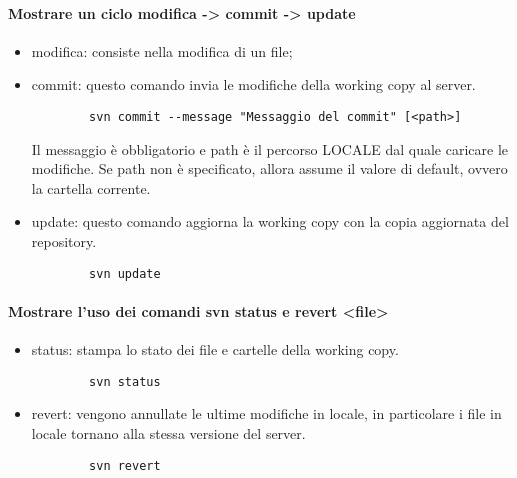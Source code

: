 \documentclass[a4paper]{article}
\begin{document}
	\paragraph{Mostrare un ciclo modifica -> commit -> update}
	\begin{itemize}
		\item modifica: consiste nella modifica di un file;
		\item commit: questo comando invia le modifiche della working copy al server.\begin{verbatim}
		svn commit --message "Messaggio del commit" [<path>]
		\end{verbatim}
		Il messaggio è obbligatorio e path è il percorso LOCALE dal quale caricare le modifiche. Se path non è specificato, allora assume il valore di default, ovvero la cartella corrente.
		\item update: questo comando aggiorna la working copy con la copia aggiornata del repository.
		\begin{verbatim}
		svn update
		\end{verbatim}
	\end{itemize}
	
	\paragraph{Mostrare l'uso dei comandi svn status e revert <file>}
	\begin{itemize}
		\item status: stampa lo stato dei file e cartelle della working copy.
		\begin{verbatim}
		svn status
		\end{verbatim}
		\item revert: vengono annullate le ultime modifiche in locale, in particolare i file in locale tornano alla stessa versione del server.
		\begin{verbatim}
		svn revert
		\end{verbatim}
	\end{itemize}
\end{document}
